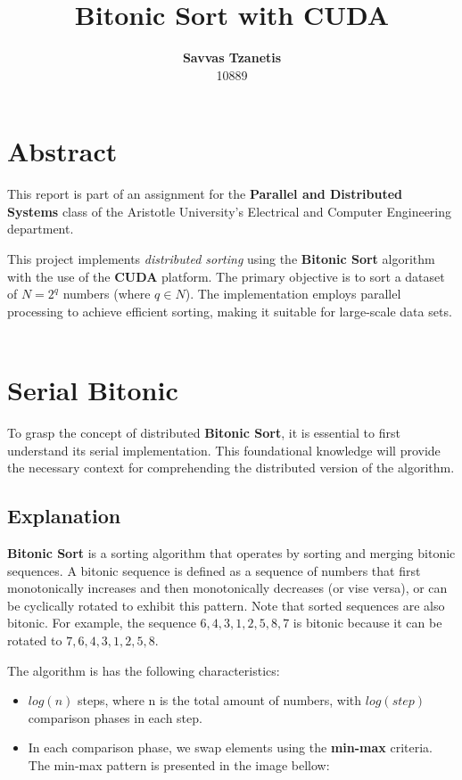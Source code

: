 \documentclass[12pt]{report}
\begin{document}
\title{\textbf{Bitonic Sort with CUDA}}
\author{\textbf{Savvas Tzanetis} \\ 10889}
\maketitle

\tableofcontents

\chapter{Abstract}
This report is part of an assignment for the \textbf{Parallel and Distributed Systems} class of the
Aristotle University's Electrical and Computer Engineering department. 

This project implements \textit{distributed sorting} using the \textbf{Bitonic Sort} algorithm with the use of the \textbf{CUDA} platform. The primary objective is to sort a dataset of $N = 2^q$ numbers (where $q \in N$). The implementation employs parallel processing to achieve efficient sorting, making it suitable for large-scale data sets.\\ \\

\chapter{Serial Bitonic}
    To grasp the concept of distributed \textbf{Bitonic Sort}, it is essential to first understand its serial implementation. This foundational knowledge will provide the necessary context for comprehending the distributed version of the algorithm.

\section{Explanation}
    \textbf{Bitonic Sort} is a sorting algorithm that operates by sorting and merging bitonic sequences. A bitonic sequence is defined as a sequence of numbers that first monotonically increases and then monotonically decreases (or vise versa), or can be cyclically rotated to exhibit this pattern. Note that sorted sequences are also bitonic. For example, the sequence $6, 4, 3, 1, 2, 5, 8, 7$ is bitonic because it can be rotated to $7, 6, 4, 3, 1, 2, 5, 8$. 

    The algorithm is has the following characteristics:
    \begin{itemize}
        \item $log(n)$ steps, where n is the total amount of numbers, with $log(step)$ comparison phases in each step.
        \item In each comparison phase, we swap elements using the \textbf{min-max} criteria. The min-max pattern is presented in the image bellow:
    \end{itemize}
\end{document}
